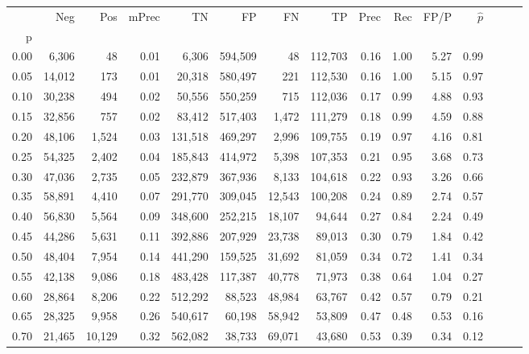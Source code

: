 \begin{tabular}{rrrrrrrrrrrrrrr}
\toprule
{} &     Neg &     Pos & mPrec &       TN &       FP &       FN &       TP &  Prec &   Rec &  FP/P & $\hat{p}$ \\
p    &         &         &       &          &          &          &          &       &       &       &           \\
\midrule
0.00 &   6,306 &      48 &  0.01 &    6,306 &  594,509 &       48 &  112,703 &  0.16 &  1.00 &  5.27 &      0.99 \\
0.05 &  14,012 &     173 &  0.01 &   20,318 &  580,497 &      221 &  112,530 &  0.16 &  1.00 &  5.15 &      0.97 \\
0.10 &  30,238 &     494 &  0.02 &   50,556 &  550,259 &      715 &  112,036 &  0.17 &  0.99 &  4.88 &      0.93 \\
0.15 &  32,856 &     757 &  0.02 &   83,412 &  517,403 &    1,472 &  111,279 &  0.18 &  0.99 &  4.59 &      0.88 \\
0.20 &  48,106 &   1,524 &  0.03 &  131,518 &  469,297 &    2,996 &  109,755 &  0.19 &  0.97 &  4.16 &      0.81 \\
0.25 &  54,325 &   2,402 &  0.04 &  185,843 &  414,972 &    5,398 &  107,353 &  0.21 &  0.95 &  3.68 &      0.73 \\
0.30 &  47,036 &   2,735 &  0.05 &  232,879 &  367,936 &    8,133 &  104,618 &  0.22 &  0.93 &  3.26 &      0.66 \\
0.35 &  58,891 &   4,410 &  0.07 &  291,770 &  309,045 &   12,543 &  100,208 &  0.24 &  0.89 &  2.74 &      0.57 \\
0.40 &  56,830 &   5,564 &  0.09 &  348,600 &  252,215 &   18,107 &   94,644 &  0.27 &  0.84 &  2.24 &      0.49 \\
0.45 &  44,286 &   5,631 &  0.11 &  392,886 &  207,929 &   23,738 &   89,013 &  0.30 &  0.79 &  1.84 &      0.42 \\
0.50 &  48,404 &   7,954 &  0.14 &  441,290 &  159,525 &   31,692 &   81,059 &  0.34 &  0.72 &  1.41 &      0.34 \\
0.55 &  42,138 &   9,086 &  0.18 &  483,428 &  117,387 &   40,778 &   71,973 &  0.38 &  0.64 &  1.04 &      0.27 \\
0.60 &  28,864 &   8,206 &  0.22 &  512,292 &   88,523 &   48,984 &   63,767 &  0.42 &  0.57 &  0.79 &      0.21 \\
0.65 &  28,325 &   9,958 &  0.26 &  540,617 &   60,198 &   58,942 &   53,809 &  0.47 &  0.48 &  0.53 &      0.16 \\
0.70 &  21,465 &  10,129 &  0.32 &  562,082 &   38,733 &   69,071 &   43,680 &  0.53 &  0.39 &  0.34 &      0.12 \\

\end{tabular}
